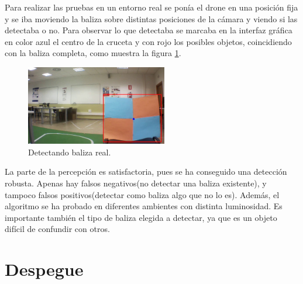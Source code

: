 \hspace{1cm} Para realizar las pruebas en un entorno real se pon\'ia el drone en una posici\'on fija y se iba moviendo la baliza sobre distintas posiciones de la c\'amara y viendo si las detectaba o no. Para observar lo que detectaba se marcaba en la interfaz gr\'afica en color azul el centro de la cruceta y con rojo los posibles objetos, coincidiendo con la baliza completa, como muestra la figura \ref{fig:Detectando_baliza_real}.

\begin{figure}[H]
	\centering
		\includegraphics[width=0.55\textwidth]{imgs/k_beacon21.jpg}
		\caption{Detectando baliza real.}
	\label{fig:Detectando_baliza_real}
\end{figure}


\hspace{1cm} La parte de la percepci\'on es satisfactoria, pues se ha conseguido una detecci\'on robusta. Apenas hay falsos negativos(no detectar una baliza existente), y tampoco falsos positivos(detectar como baliza algo que no lo es). Adem\'as, el algoritmo se ha probado en diferentes ambientes con distinta luminosidad. Es importante tambi\'en el tipo de baliza elegida a detectar, ya que es un objeto dif\'icil de confundir con otros.


\section{Despegue}



